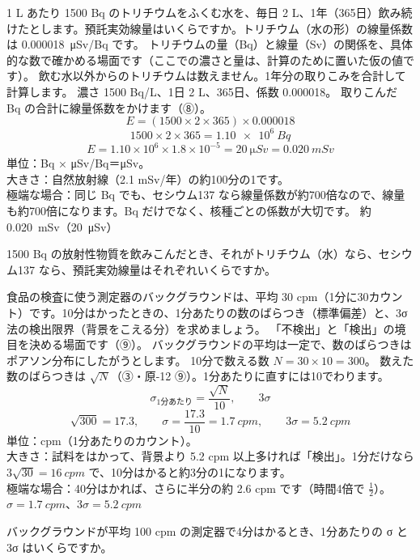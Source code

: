 \label{ph:原-14:ex9}
\begin{phreidai}[トリチウムをふくむ水を飲み続けたら]
1 L あたり 1500 Bq のトリチウムをふくむ水を、毎日 2 L、1年（365日）飲み続けたとします。預託実効線量はいくらですか。トリチウム（水の形）の線量係数は \qty{0.000018}{\micro Sv}/Bq です。
\phbamen
トリチウムの量（Bq）と線量（Sv）の関係を、具体的な数で確かめる場面です（ここでの濃さと量は、計算のために置いた仮の値です）。
\phmushi
飲む水以外からのトリチウムは数えません。1年分の取りこみを合計して計算します。
\phzu
濃さ 1500 Bq/L、1日 2 L、365日、係数 0.000018。
\phriyu
取りこんだ Bq の合計に線量係数をかけます（⑧）。
\phtateru
\[ E=(1500\times2\times365)\times0.000018 \]
\phtoku
\[ 1500\times2\times365=\qty{1.10e6}{Bq} \]
\[ E=1.10\times10^6\times1.8\times10^{-5}=\qty{20}{\micro Sv}=\qty{0.020}{mSv} \]
\phtashikame
単位：Bq × \si{\micro Sv}/Bq＝\si{\micro Sv}。\\
大きさ：自然放射線（2.1 mSv/年）の約100分の1です。\\
極端な場合：同じ Bq でも、セシウム137 なら線量係数が約700倍なので、線量も約700倍になります。Bq だけでなく、核種ごとの係数が大切です。
\kotae 約 \qty{0.020}{mSv}（\qty{20}{\micro Sv}）
\end{phreidai}
\begin{jibun}
1500 Bq の放射性物質を飲みこんだとき、それがトリチウム（水）なら、セシウム137 なら、預託実効線量はそれぞれいくらですか。
\end{jibun}

\label{ph:原-14:ex10}
\begin{phreidai}[背景のばらつきと検出限界]
食品の検査に使う測定器のバックグラウンドは、平均 30 cpm（1分に30カウント）です。10分はかったときの、1分あたりの数のばらつき（標準偏差）と、3σ 法の検出限界（背景をこえる分）を求めましょう。
\phbamen
「不検出」と「検出」の境目を決める場面です（⑨）。
\phmushi
バックグラウンドの平均は一定で、数のばらつきはポアソン分布にしたがうとします。
\phzu
10分で数える数 $N=30\times10=300$。
\phriyu
数えた数のばらつきは $\sqrt N$（③・原-12 ⑨）。1分あたりに直すには10でわります。
\phtateru
\[ \sigma_{\text{1分あたり}}=\frac{\sqrt{N}}{10},\qquad 3\sigma \]
\phtoku
\[ \sqrt{300}=17.3,\qquad \sigma=\frac{17.3}{10}=\qty{1.7}{cpm},\qquad 3\sigma=\qty{5.2}{cpm} \]
\phtashikame
単位：cpm（1分あたりのカウント）。\\
大きさ：試料をはかって、背景より 5.2 cpm 以上多ければ「検出」。1分だけなら $3\sqrt{30}=\qty{16}{cpm}$ で、10分はかると約3分の1になります。\\
極端な場合：40分はかれば、さらに半分の約 2.6 cpm です（時間4倍で $\tfrac12$）。
\kotae $\sigma=\qty{1.7}{cpm}$、$3\sigma=\qty{5.2}{cpm}$
\end{phreidai}
\begin{jibun}
バックグラウンドが平均 100 cpm の測定器で4分はかるとき、1分あたりの σ と 3σ はいくらですか。
\end{jibun}

